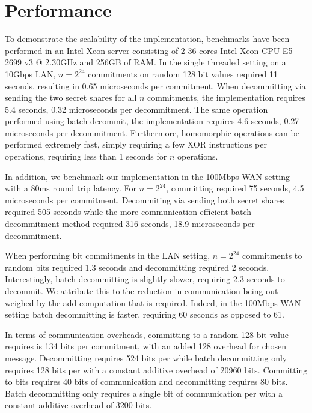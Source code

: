 \section{Performance}

To demonstrate the scalability of the implementation, benchmarks have been performed in an Intel Xeon server consisting of 2 36-cores Intel Xeon CPU E5-2699 v3 @ 2.30GHz and 256GB of RAM. In the single threaded setting on a 10Gbps LAN, $n=2^{24}$ commitments on random 128 bit values required 11 seconds, resulting in 0.65 microseconds per commitment. When decommitting via sending the two secret shares for all $n$ commitments, the implementation requires 5.4 seconds, 0.32 microseconds per decommitment. The same operation performed using batch decommit, the implementation requires 4.6 seconds, 0.27 microseconds per decommitment. Furthermore, homomorphic operations can be performed extremely fast, simply requiring  a few XOR instructions per operations, requiring less than 1 seconds for $n$ operations. 

In addition, we benchmark our implementation in the 100Mbps WAN setting with a 80ms round trip latency. For $n=2^{24}$, committing  required 75 seconds, 4.5 microseconds per commitment. Decommiting via sending both secret shares required 505 seconds while the more communication efficient batch decommitment method required 316 seconds, 18.9 microseconds per decommitment.



When performing bit commitments in the LAN setting, $n=2^{24}$ commitments to random bits required 1.3 seconds and decommitting required 2 seconds. Interestingly, batch decommitting is slightly slower, requiring 2.3 seconds to decommit. We attribute this to the reduction in communication being out weighed by the add computation that is required. Indeed, in the 100Mbps WAN setting batch decommitting is faster, requiring 60 seconds as opposed to 61.

In terms of communication overheads, committing to a random 128 bit value requires is 134 bits per commitment, with an added 128 overhead for chosen message. Decommitting requires 524 bits per while batch decommitting only requires 128 bits per with a constant additive overhead of 20960 bits. Committing to bits requires 40 bits of communication and decommitting requires 80 bits. Batch decommitting only requires a single bit of communication per with a constant additive overhead of 3200 bits.
